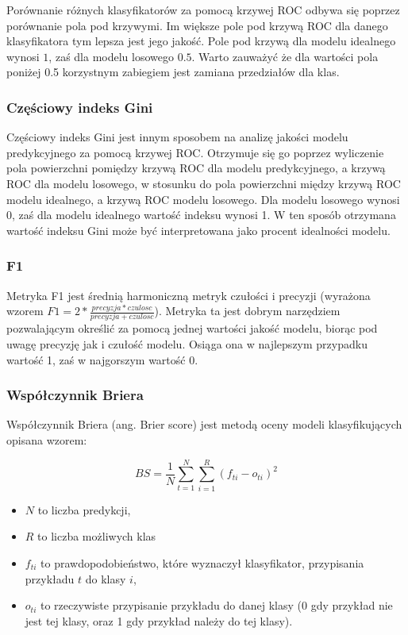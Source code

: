 \documentclass[a4paper, twoside, 11pt, openright]{article}
\begin{document}
Porównanie różnych klasyfikatorów za pomocą krzywej ROC odbywa się poprzez porównanie pola pod krzywymi. Im większe pole pod krzywą ROC dla danego klasyfikatora tym lepsza jest jego jakość. Pole pod krzywą dla modelu idealnego wynosi $1$, zaś dla modelu losowego $0.5$. Warto zauważyć że dla wartości pola poniżej 0.5  korzystnym zabiegiem jest zamiana przedziałów dla klas.


\subsubsection{Częściowy indeks Gini} %

Częściowy indeks Gini jest innym sposobem na analizę jakości modelu predykcyjnego za pomocą krzywej ROC. Otrzymuje się go poprzez wyliczenie pola powierzchni pomiędzy krzywą ROC dla modelu predykcyjnego, a krzywą ROC dla modelu losowego, w stosunku do pola powierzchni między krzywą ROC modelu idealnego, a krzywą ROC modelu losowego. Dla modelu losowego wynosi 0, zaś dla modelu idealnego wartość indeksu wynosi 1. W ten sposób otrzymana wartość indeksu Gini może być interpretowana jako procent idealności modelu.

\subsubsection{F1} %

Metryka F1 jest średnią harmoniczną metryk czułości i precyzji (wyrażona wzorem $F1=2*\frac{precyzja*czulosc}{precyzja+czulosc}$). Metryka ta jest dobrym narzędziem pozwalającym określić za pomocą jednej wartości jakość modelu, biorąc pod uwagę precyzję jak i czułość modelu. Osiąga ona w najlepszym przypadku wartość 1, zaś w najgorszym wartość 0. 

\subsubsection{Współczynnik Briera \cite{brier}}

Współczynnik Briera (ang. Brier score) jest metodą oceny modeli klasyfikujących opisana wzorem:

$$	BS=\frac{1}{N} \sum_{t=1}^{N} \sum_{i=1}^{R}(f_{ti}-o_{ti})^2 $$

\begin{itemize}
\item $N$ to liczba predykcji,
\item $R$  to liczba możliwych klas
\item $f_{ti}$ to prawdopodobieństwo, które wyznaczył klasyfikator, przypisania przykładu $t$ do klasy $i$,
\item $o_{ti}$ to rzeczywiste przypisanie przykładu do danej klasy (0 gdy przykład nie jest tej klasy, oraz 1 gdy przykład należy do tej klasy).
\end{itemize}
\end{document}
